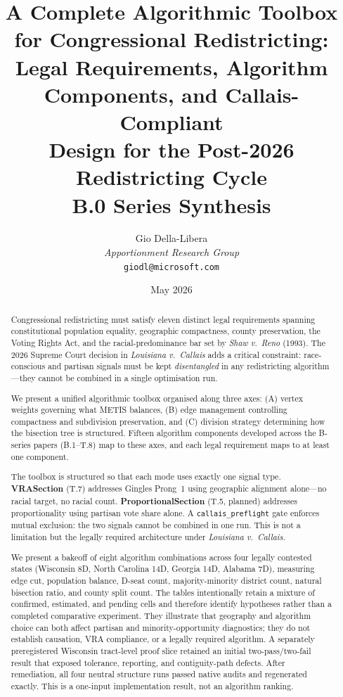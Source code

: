 \documentclass[12pt]{article}
\title{\textbf{A Complete Algorithmic Toolbox for Congressional Redistricting:\\
       Legal Requirements, Algorithm Components, and Callais-Compliant\\
       Design for the Post-2026 Redistricting Cycle}\\[0.5em]
       \large B.0 Series Synthesis}
\author{%
  Gio Della-Libera\\
  \textit{Apportionment Research Group}\\
  \small\texttt{giodl@microsoft.com}
}
\date{May 2026}
\newcommand{\case}[1]{\textit{#1}}
\newcommand{\callais}{\case{Louisiana v.\ Callais}}
\newcommand{\shaw}{\case{Shaw v.\ Reno}}
\begin{document}
\maketitle

\begin{abstract}
Congressional redistricting must satisfy eleven distinct legal requirements
spanning constitutional population equality, geographic compactness, county
preservation, the Voting Rights Act, and the racial-predominance bar set by
\shaw{} (1993).
The 2026 Supreme Court decision in \callais{} adds a critical constraint:
race-conscious and partisan signals must be kept \emph{disentangled} in any
redistricting algorithm---they cannot be combined in a single optimisation run.

We present a unified algorithmic toolbox organised along three axes:
(A) vertex weights governing what METIS balances,
(B) edge management controlling compactness and subdivision preservation, and
(C) division strategy determining how the bisection tree is structured.
Fifteen algorithm components developed across the B-series papers (B.1--T.8)
map to these axes, and each legal requirement maps to at least one component.

The toolbox is structured so that each mode uses exactly one signal type.
\textbf{VRASection} (T.7) addresses Gingles Prong~1 using geographic alignment
alone---no racial target, no racial count.
\textbf{ProportionalSection} (T.5, planned) addresses proportionality using
partisan vote share alone.
A \texttt{callais\_preflight} gate enforces mutual exclusion: the two signals
cannot be combined in one run.
This is not a limitation but the legally required architecture under \callais{}.

We present a bakeoff of eight algorithm combinations across four legally
contested states (Wisconsin 8D, North Carolina 14D, Georgia 14D,
Alabama 7D), measuring edge cut, population balance, D-seat count,
majority-minority district count, natural bisection ratio, and county split count.
The tables intentionally retain a mixture of confirmed, estimated, and pending
cells and therefore identify hypotheses rather than a completed comparative
experiment. They illustrate that geography and algorithm choice can both affect
partisan and minority-opportunity diagnostics; they do not establish causation,
VRA compliance, or a legally required algorithm.
A separately preregistered Wisconsin tract-level proof slice retained an initial
two-pass/two-fail result that exposed tolerance, reporting, and contiguity-path
defects. After remediation, all four neutral structure runs passed native audits
and regenerated exactly. This is a one-input implementation result, not an
algorithm ranking.


\end{abstract}
\end{document}
